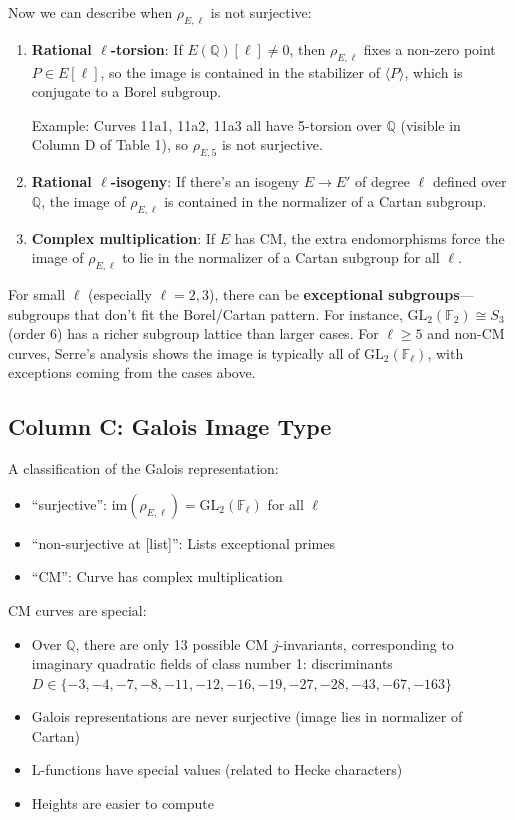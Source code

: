 \documentclass[11pt]{article}
\begin{document}
Now we can describe when $\rho_{E,\ell}$ is not surjective:

\begin{enumerate}
\item \textbf{Rational $\ell$-torsion}: If $E(\mathbb{Q})[\ell] \neq 0$, then $\rho_{E,\ell}$ fixes a non-zero point $P \in E[\ell]$, so the image is contained in the stabilizer of $\langle P \rangle$, which is conjugate to a Borel subgroup.

Example: Curves 11a1, 11a2, 11a3 all have 5-torsion over $\mathbb{Q}$ (visible in Column D of Table 1), so $\rho_{E,5}$ is not surjective.

\item \textbf{Rational $\ell$-isogeny}: If there's an isogeny $E \to E'$ of degree $\ell$ defined over $\mathbb{Q}$, the image of $\rho_{E,\ell}$ is contained in the normalizer of a Cartan subgroup.

\item \textbf{Complex multiplication}: If $E$ has CM, the extra endomorphisms force the image of $\rho_{E,\ell}$ to lie in the normalizer of a Cartan subgroup for all $\ell$.
\end{enumerate}

For small $\ell$ (especially $\ell = 2, 3$), there can be \textbf{exceptional subgroups}---subgroups that don't fit the Borel/Cartan pattern. For instance, $\text{GL}_2(\mathbb{F}_2) \cong S_3$ (order 6) has a richer subgroup lattice than larger cases. For $\ell \geq 5$ and non-CM curves, Serre's analysis shows the image is typically all of $\text{GL}_2(\mathbb{F}_\ell)$, with exceptions coming from the cases above.

\subsection{Column C: Galois Image Type}

A classification of the Galois representation:
\begin{itemize}
\item ``surjective'': $\text{im}(\rho_{E,\ell}) = \text{GL}_2(\mathbb{F}_\ell)$ for all $\ell$
\item ``non-surjective at [list]'': Lists exceptional primes
\item ``CM'': Curve has complex multiplication
\end{itemize}

CM curves are special:
\begin{itemize}
\item Over $\mathbb{Q}$, there are only 13 possible CM $j$-invariants, corresponding to imaginary quadratic fields of class number 1: discriminants $D \in \{-3, -4, -7, -8, -11, -12, -16, -19, -27, -28, -43, -67, -163\}$
\item Galois representations are never surjective (image lies in normalizer of Cartan)
\item L-functions have special values (related to Hecke characters)
\item Heights are easier to compute
\end{itemize}
\end{document}
